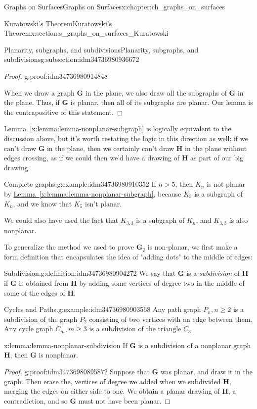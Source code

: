 \documentclass[oneside,10pt,]{book}
\newcommand{\xreffont}{\relax}
\numberwithin{equation}{section}
\newcommand{\bfG}{\mathbf{G}}
\newcommand{\bfH}{\mathbf{H}}
\newcommand{\gt}{>}
\begin{document}
\begin{chapterptx}{Graphs on Surfaces}{}{Graphs on Surfaces}{}{}{x:chapter:ch_graphs_on_surfaces}
\begin{sectionptx}{Kuratowski's Theorem}{}{Kuratowski's Theorem}{}{}{x:section:s_graphs_on_surfaces_Kuratowski}
\begin{subsectionptx}{Planarity, subgraphs, and subdivisions}{}{Planarity, subgraphs, and subdivisions}{}{}{g:subsection:idm34736980936672}
\begin{proof}{}{g:proof:idm34736980914848}
\par
When we draw a graph \(\bfG\) in the plane, we also draw all the subgraphs of \(\bfG\) in the plane.  Thus, if \(\bfG\) is planar, then all of its subgraphs are planar.  Our lemma is the contrapositive of this statement.%
\end{proof}
\hyperref[x:lemma:lemma-nonplanar-subgraph]{Lemma~{\xreffont\ref{x:lemma:lemma-nonplanar-subgraph}}} is logically equivalent to the discussion above, but it's worth restating the logic in this direction as well: if we can't draw \(\bfG\) in the plane, then we certainly can't draw \(\bfH\) in the plane without edges crossing, as if we could then we'd have a drawing of \(\bfH\) as part of our big drawing.%
\begin{example}{Complete graphs.}{g:example:idm34736980910352}%
If \(n\gt 5\), then \(K_n\) is not planar by \hyperref[x:lemma:lemma-nonplanar-subgraph]{Lemma~{\xreffont\ref{x:lemma:lemma-nonplanar-subgraph}}}, because \(K_5\) is a subgraph of \(K_n\), and we know that \(K_5\) isn't planar.%
\par
We could also have used the fact that \(K_{3,3}\) is a subgraph of \(K_n\), and \(K_{3,3}\) is also nonplanar.%
\end{example}
To generalize the method we used to prove \(\bfG_2\) is non-planar, we first make a form definition that encapsulates the idea of "adding dots" to the middle of edges:%
\begin{definition}{Subdivision.}{g:definition:idm34736980904272}%
We say that \(\bfG\) is a \emph{subdivision} of \(\bfH\) if \(\bfG\) is obtained from \(\bfH\) by adding some vertices of degree two in the middle of some of the edges of \(\bfH\).%
\end{definition}
\begin{example}{Cycles and Paths.}{g:example:idm34736980903568}%
Any path graph \(P_n, n\geq 2\) is a subdivision of the graph \(P_2\) consisting of two vertices with an edge between them.  Any cycle graph \(C_m, m\geq 3\) is a subdivision of the triangle \(C_3\)%
\end{example}
\begin{lemma}{}{}{x:lemma:lemma-nonplanar-subdivision}%
If \(\bfG\) is a subdivision of a nonplanar graph \(\bfH\), then \(\bfG\) is nonplanar.%
\end{lemma}
\begin{proof}{}{g:proof:idm34736980895872}
Suppose that \(\bfG\) was planar, and draw it in the graph.  Then erase the, vertices of degree we added when we subdivided \(\bfH\), merging the edges on either side to one.  We obtain a planar drawing of \(\bfH\), a contradiction, and so \(\bfG\) must not have been planar.%

\end{proof}
\end{subsectionptx}
\end{sectionptx}
\end{chapterptx}
\end{document}
